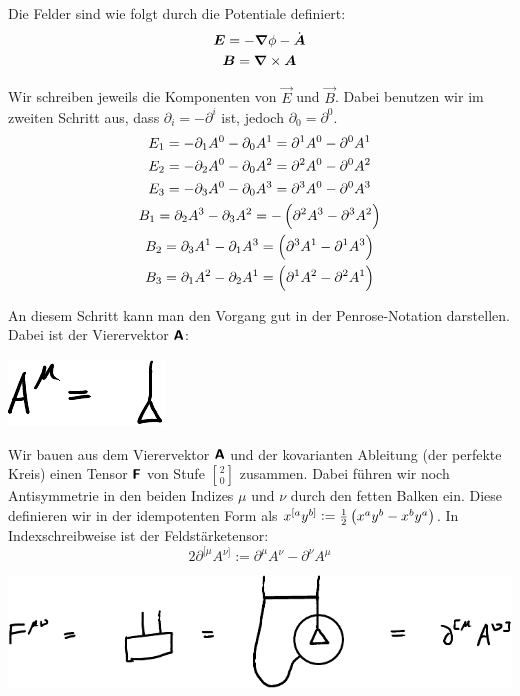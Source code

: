 Die Felder sind wie folgt durch die Potentiale definiert:
\begin{gather*}
	\boldsymbol{E} = - \boldsymbol{\nabla} \phi - \dot{\boldsymbol{A}} \\
	\boldsymbol{B} = \boldsymbol{\nabla} \times \boldsymbol{A}
\end{gather*}

Wir schreiben jeweils die Komponenten von $\vec E$ und $\vec B$. Dabei benutzen
wir im zweiten Schritt aus, dass $\partial_i = - \partial^i$ ist, jedoch
$\partial_0 = \partial^0$.
\begin{gather*}
	E_1
	= - \partial_1 A^0 - \partial_0 A^1
	= \partial^1 A^0 - \partial^0 A^1
	\\
	E_2
	= - \partial_2 A^0 - \partial_0 A^2
	= \partial^2 A^0 - \partial^0 A^2
	\\
	E_3
	= - \partial_3 A^0 - \partial_0 A^3
	= \partial^3 A^0 - \partial^0 A^3
	\\
	B_1
	= \partial_2 A^3 - \partial_3 A^2
	= -\del{\partial^2 A^3 - \partial^3 A^2}
	\\
	B_2
	= \partial_3 A^1 - \partial_1 A^3
	= \del{\partial^3 A^1 - \partial^1 A^3}
	\\
	B_3
	= \partial_1 A^2 - \partial_2 A^1
	= \del{\partial^1 A^2 - \partial^2 A^1}
	\\
\end{gather*}

An diesem Schritt kann man den Vorgang gut in der Penrose-Notation
\cite{penrose-road_to_reality} darstellen.  Dabei ist der Vierervektor $\boldsymbol{\mathsf{A}}$:
\begin{center}
	\includegraphics{H1-Penrose-2-crop.pdf}
\end{center}

Wir bauen aus dem Vierervektor $\boldsymbol{\mathsf{A}}$ und der kovarianten Ableitung (der
perfekte Kreis) einen Tensor $\boldsymbol{\mathsf{F}}$ von Stufe ${2 \brack 0}$ zusammen. Dabei
führen wir noch Antisymmetrie in den beiden Indizes $\mu$ und $\nu$ durch den
fetten Balken ein. Diese definieren wir in der idempotenten Form als $x^{[a}
y^{b]} := \half \del{x^a y^b - x^b y^a}$. In Indexschreibweise ist der
Feldstärketensor:
\[
	2 \partial^{[\mu} A^{\nu]} := \partial^\mu A^\nu - \partial^\nu A^\mu
\]
\begin{center}
	\includegraphics{H1-Penrose-1-crop.pdf}
\end{center}

